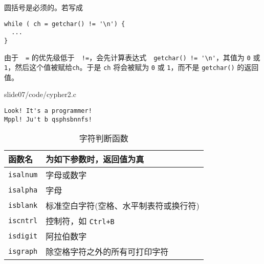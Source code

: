 \begin{frame}[fragile]
  圆括号是必须的。若写成
\begin{lstlisting}
while ( ch = getchar() != '\n') {
  ...   
}
\end{lstlisting}
由于　\lstinline|=| 的优先级低于　\lstinline|!=|，会先计算表达式　\lstinline|getchar() != '\n'|，其值为 \lstinline|0| 或 \lstinline|1|，然后这个值被赋给\lstinline|ch|。于是 \lstinline|ch| 将会被赋为 \lstinline|0| 或 \lstinline|1|，而不是 \lstinline|getchar()| 的返回值。
\end{frame}


\begin{frame}[fragile]
  
  {slide07/code/cypher2.c}
\end{frame}

\begin{frame}[fragile]
\begin{lstlisting}[backgroundcolor=\color{red!10}]
Look! It's a programmer!
Mppl! Ju't b qsphsbnnfs!
\end{lstlisting}
\end{frame}

\begin{frame}[fragile]
\begin{table}
\centering
\caption{字符判断函数}
\begin{tabular}{p{2cm}|p{8cm}}\hline
函数名&为如下参数时，返回值为真\\\hline\hline
\lstinline|isalnum| & 字母或数字\\[0.1in] 
\lstinline|isalpha| & 字母 \\[0.1in] 
\lstinline|isblank| & 标准空白字符(空格、水平制表符或换行符) \\[0.1in] 
\lstinline|iscntrl| & 控制符，如 \lstinline|Ctrl+B| \\[0.1in] 
\lstinline|isdigit| & 阿拉伯数字 \\[0.1in]
\lstinline|isgraph| & 除空格字符之外的所有可打印字符 \\\hline
\end{tabular}
\end{table}
\end{frame}

